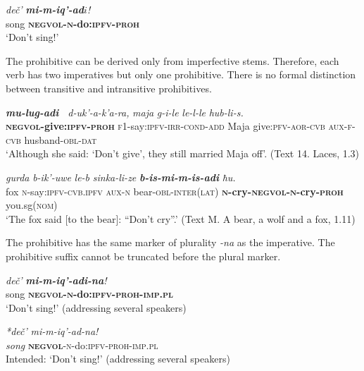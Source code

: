 ﻿\documentclass[output=paper]{langsci/langscibook}
\begin{document}
\ea  %
\gll \emph{deč'} \emph{\textbf{mi-m-iq'-ad\(i\)}!}\\
 song \textbf{\textsc{negvol}-\textsc{n}-do:\textsc{ipfv}-\textsc{proh}}\\
\glt `Don't sing!'
\z

The prohibitive can be derived only from imperfective stems. Therefore,
each verb has two imperatives but only one prohibitive. There is no
formal distinction between transitive and intransitive prohibitives.

\ea %
\gll \emph{\textbf{mu-lug-adi~}} \emph{d-uk'-a-k'a-ra,}  \emph{maja} \emph{g-i-le} \emph{le-l-le} \emph{hub-li-s.}\\
 \textbf{\textsc{negvol}-give:\textsc{ipfv}-\textsc{proh}} \textsc{f1}-say:\textsc{ipfv}-\textsc{irr}-\textsc{cond}-\textsc{add}  Maja give:\textsc{pfv}-\textsc{aor}-\textsc{cvb} \textsc{aux}-\textsc{f}-\textsc{cvb} husband-\textsc{obl}-\textsc{dat} \\
\glt `Although she said: `Don't give', they still married Maja off'. (Text 14. Laces, 1.3)

\ex \label{ex:5:46} %
\gll \emph{gurda} \emph{b-ik'-uwe} \emph{le-b}  \emph{sinka-li-ze} \emph{\textbf{b-is-mi-m-is-adi}} \emph{ħu.}\\
fox \textsc{n}-say:\textsc{ipfv}-\textsc{cvb.ipfv} \textsc{aux}-\textsc{n} bear-\textsc{obl}-\textsc{inter}(\textsc{lat}) \textbf{\textsc{n}-cry-\textsc{negvol}-\textsc{n}-cry-\textsc{proh}} you.sg(\textsc{nom})\\
\glt `The fox said [to the bear]: ``Don't cry''.' (Text M. A bear, a wolf
and a fox, 1.11)
\z

The prohibitive has the same marker of plurality
\emph{-na} as the imperative. The prohibitive suffix cannot be truncated before the plural
marker.

\ea %
\gll \emph{deč'} \emph{\textbf{mi-m-iq'-adi-na}!}\\
 song \textbf{\textsc{negvol}-\textsc{n}-do:\textsc{ipfv}-\textsc{proh}-\textsc{imp}.\textsc{pl}}\\
\glt `Don't sing!' (addressing several speakers)

\ex %
\gll \emph{*deč'} \emph{mi-m-iq'-ad-na!}\\
 \emph{song} \textbf{\textsc{negvol}}-\textsc{n}-do:\textsc{ipfv}-\textsc{proh}-\textsc{imp}.\textsc{pl}\\
\glt Intended: `Don't sing!' (addressing several speakers)
\z
\end{document}
